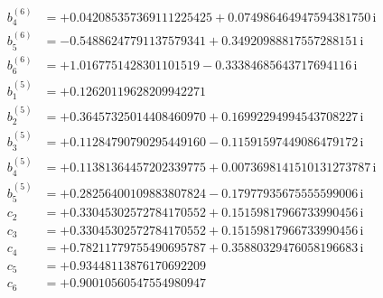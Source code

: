 {\begin{align*}
b^{(6)}_{4} &= +0.042085357369111225425 + 0.074986464947594381750\,\mathrm{i}\\
b^{(6)}_{5} &= -0.54886247791137579341 + 0.34920988817557288151\,\mathrm{i}\\
b^{(6)}_{6} &= +1.0167751428301101519 - 0.33384685643717694116\,\mathrm{i}\\[1mm]
b^{(5)}_{1} &= +0.12620119628209942271\\
b^{(5)}_{2} &= +0.36457325014408460970 + 0.16992294994543708227\,\mathrm{i}\\
b^{(5)}_{3} &= +0.11284790790295449160 - 0.11591597449086479172\,\mathrm{i}\\
b^{(5)}_{4} &= +0.11381364457202339775 + 0.0073698141510131273787\,\mathrm{i}\\
b^{(5)}_{5} &= +0.28256400109883807824 - 0.17977935675555599006\,\mathrm{i}\\[1mm]
c_{2} &= +0.33045302572784170552 + 0.15159817966733990456\,\mathrm{i}\\
c_{3} &= +0.33045302572784170552 + 0.15159817966733990456\,\mathrm{i}\\
c_{4} &= +0.78211779755490695787 + 0.35880329476058196683\,\mathrm{i}\\
c_{5} &= +0.93448113876170692209\\
c_{6} &= +0.90010560547554980947
\end{align*}
}


